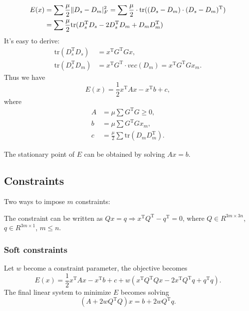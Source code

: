 \documentclass{fancydoc}
\newcommand{\tr}{\mathrm{tr}}
\begin{document}
\begin{subequations}
	\begin{align}
	 E(x) &= \sum \frac{\mu}{2} \Vert D_s - D_m \vert^2_F = \sum \frac{\mu}{2} \cdot \tr((D_s - D_m)\cdot(D_s - D_m)^\mathrm{T}) \newline \\
	 &= \sum \frac{\mu}{2}  \tr(D_s^{\mathrm{T}}D_s - 2D_s^{\mathrm{T}}D_m +D_mD_m^{\mathrm{T}}) 
	\end{align}
\end{subequations}
It's easy to derive:
\begin{subequations}
\begin{align}
\tr (D_s^\mathrm{T}D_s)& = x^\mathrm{T}G^\mathrm{T}Gx,\\
\tr(D_s^\mathrm{T} D_m) &= x^\mathrm{T}G^\mathrm{T} \cdot vec(D_m)= x^\mathrm{T}G^\mathrm{T} Gx_m.
\end{align}
\end{subequations}
Thus we have
\begin{equation}
E(x) =\frac{1}{2} x^\mathrm{T}Ax - x^\mathrm{T} b + c,
\end{equation}
where
\begin{subequations}
	\begin{align}
	A &= \mu\sum G^\mathrm{T}G \geq 0, \\
	 b& =\mu \sum G^\mathrm{T} Gx_m, \\
	  c &= \frac{\mu}{2} \sum \tr(D_mD_m^\mathrm{T}).
	\end{align}
\end{subequations}

The stationary point of $E$ can be obtained by solving $ Ax = b$.

\subsection{Constraints}
Two ways to impose $m$ constraints:

The constraint can be written as $Qx=q \Rightarrow x^{\mathrm{T}}Q^{\mathrm{T}} - q^{\mathrm{T}}=0$, where $Q\in R^{3m \times 3n}$, $q\in R^{3m \times 1}$, $m \leq n$.

\subsubsection{Soft constraints}
Let $w$ become a constraint parameter, the objective becomes
\begin{equation}
E(x) =\frac{1}{2}x^{\mathrm{T}}A x - x^{\mathrm{T}} b +c + w(x^{\mathrm{T}}Q^{\mathrm{T}}Qx - 2x^{\mathrm{T}}Q^{\mathrm{T}}q + q^{\mathrm{T}}q).
\end{equation}
The final linear system to minimize $E$ becomes solving
\begin{equation}
 ( A + 2wQ^{\mathrm{T}}Q)x = b + 2 wQ^{\mathrm{T}}q.
\end{equation}
\end{document}

